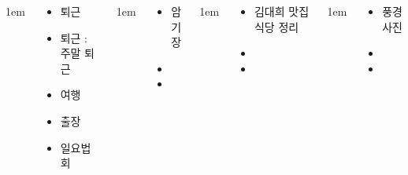 \documentclass[	20pt, 
							a0paper, 
							landscape,
							margin=0mm, %
							innermargin=10mm,  		%
							blockverticalspace=4mm, %
							colspace=5mm, 
							subcolspace=0mm
							]{tikzposter}
\begin{document}
\begin{columns}
			{
					\setlength{\leftmargini}{4em}
					\setlength{\labelsep} {1em}
				\begin{LARGE}
					\begin{itemize}
					\item 퇴근
					\item 퇴근 : 주말 퇴근
					\item 여행
					\item 출장
					\item 일요법회
					\end{itemize}
				\end{LARGE}
			} %


			{
					\setlength{\leftmargini}{4em}
					\setlength{\labelsep} {1em}
				\begin{LARGE}
					\begin{itemize}
					\item 암기장
					\item 
					\item 
					\end{itemize}
				\end{LARGE}
			} %


			{
					\setlength{\leftmargini}{4em}
					\setlength{\labelsep} {1em}
				\begin{LARGE}
					\begin{itemize}
					\item 김대희 맛집 식당 정리
					\item 
					\item 
					\end{itemize}
				\end{LARGE}
			} %

			{
					\setlength{\leftmargini}{4em}
					\setlength{\labelsep} {1em}
				\begin{LARGE}
					\begin{itemize}
					\item 풍경 사진
					\item 
					\item 
					\end{itemize}
				\end{LARGE}
			} %



\end{columns}
\end{document}
